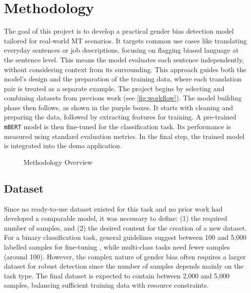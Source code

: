 \chapter{Methodology}
The goal of this project is to develop a practical gender bias detection model tailored for real-world MT scenarios. It targets common use cases like translating everyday sentences or job descriptions, focusing on flagging biased language at the sentence level. This means the model evaluates each sentence independently, without considering context from its surrounding. This approach guides both the model's design and the preparation of the training data, where each translation pair is treated as a separate example. The project begins by selecting and combining datasets from previous work (see \autoref{fig:workflow}). The model building phase then follows, as shown in the purple boxes. It starts with cleaning and preparing the data, followed by extracting features for training. A pre-trained \texttt{mBERT} model is then fine-tuned for the classification task. Its performance is measured using standard evaluation metrics. In the final step, the trained model is integrated  into the demo application.

\vspace{1cm} 
\begin{figure}[htb]
    \centering
    \scalebox{0.8}{}
    \caption{Methodology Overview}
    \label{fig:workflow}
\end{figure}
\vspace{1cm} 

\section{Dataset}
    Since no ready-to-use dataset existed for this task and no prior work had developed a comparable model, it was necessary to define: (1) the required number of samples, and (2) the desired content for the creation of a new dataset. For a binary classification task, general guidelines suggest between 100 and 5,000 labelled samples for fine-tuning \parencite{pecherComparingSpecialisedSmall2024}, while multi-class tasks need fewer samples (around 100). However, the complex nature of gender bias often requires a larger dataset for robust detection since the number of samples depends mainly on the task type. The final dataset is expected to contain between 2,000 and 5,000 samples, balancing sufficient training data with resource constraints.

